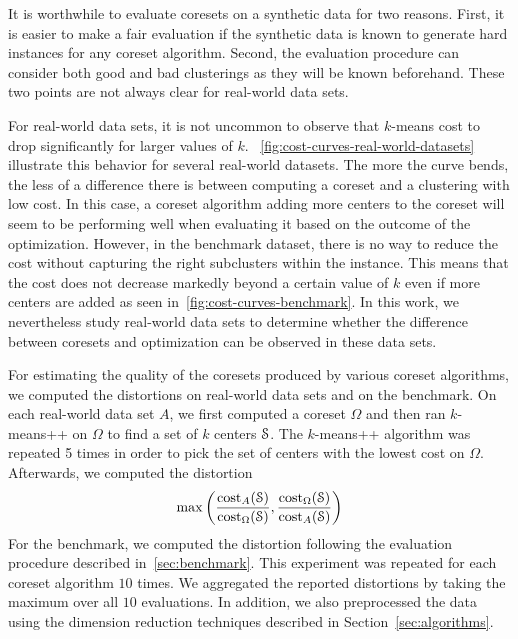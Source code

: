 It is worthwhile to evaluate coresets on a synthetic data for two reasons. First, it is easier to make a fair evaluation if the synthetic data is known to generate hard instances for any coreset algorithm. Second, the evaluation procedure can consider both good and bad clusterings as they will be known beforehand. These two points are not always clear for real-world data sets.

For real-world data sets, it is not uncommon to observe that $k$-means cost to drop significantly for larger values of $k$. ~\cref{fig:cost-curves-real-world-datasets} illustrate this behavior for several real-world datasets. The more the curve bends, the less of a difference there is between computing a coreset and a clustering with low cost. In this case, a coreset algorithm adding more centers to the coreset will seem to be performing well when evaluating it based on the outcome of the optimization. However, in the benchmark dataset, there is no way to reduce the cost without capturing the right subclusters within the instance. This means that the cost does not decrease markedly beyond a certain value of $k$ even if more centers are added as seen in~\cref{fig:cost-curves-benchmark}. In this work, we nevertheless study real-world data sets to determine whether the difference between coresets and optimization can be observed in these data sets.




For estimating the quality of the coresets produced by various coreset algorithms, we computed the distortions on real-world data sets and on the benchmark. On each real-world data set $A$, we first computed a coreset $\Omega$ and then ran $k$-means++ on $\Omega$ to find a set of $k$ centers $\mathcal{S}$. The $k$-means++ algorithm was repeated 5 times in order to pick the set of centers with the lowest cost on $\Omega$.
Afterwards, we computed the distortion
\begin{align*}
    \max\left(
      \frac{\text{cost}_A(\mathcal{S})}{\text{cost}_{\Omega}(\mathcal{S})},
      \frac{\text{cost}_{\Omega}(\mathcal{S})}{\text{cost}_A(\mathcal{S})}
    \right)
\end{align*}
For the benchmark, we computed the distortion following the evaluation procedure described in~\cref{sec:benchmark}. This experiment was repeated for each coreset algorithm $10$ times. We aggregated the reported distortions by taking the maximum over all $10$ evaluations. In addition, we also preprocessed the data using the dimension reduction techniques described in Section~\ref{sec:algorithms}.


